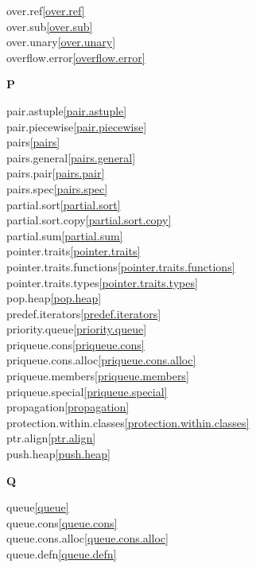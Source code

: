 \begin{multicols}{2}
over.ref\quad\ref{over.ref}\\
over.sub\quad\ref{over.sub}\\
over.unary\quad\ref{over.unary}\\
overflow.error\quad\ref{overflow.error}\\
\par \textbf{P}\par
pair.astuple\quad\ref{pair.astuple}\\
pair.piecewise\quad\ref{pair.piecewise}\\
pairs\quad\ref{pairs}\\
pairs.general\quad\ref{pairs.general}\\
pairs.pair\quad\ref{pairs.pair}\\
pairs.spec\quad\ref{pairs.spec}\\
partial.sort\quad\ref{partial.sort}\\
partial.sort.copy\quad\ref{partial.sort.copy}\\
partial.sum\quad\ref{partial.sum}\\
pointer.traits\quad\ref{pointer.traits}\\
pointer.traits.functions\quad\ref{pointer.traits.functions}\\
pointer.traits.types\quad\ref{pointer.traits.types}\\
pop.heap\quad\ref{pop.heap}\\
predef.iterators\quad\ref{predef.iterators}\\
priority.queue\quad\ref{priority.queue}\\
priqueue.cons\quad\ref{priqueue.cons}\\
priqueue.cons.alloc\quad\ref{priqueue.cons.alloc}\\
priqueue.members\quad\ref{priqueue.members}\\
priqueue.special\quad\ref{priqueue.special}\\
propagation\quad\ref{propagation}\\
protection.within.classes\quad\ref{protection.within.classes}\\
ptr.align\quad\ref{ptr.align}\\
push.heap\quad\ref{push.heap}\\
\par \textbf{Q}\par
queue\quad\ref{queue}\\
queue.cons\quad\ref{queue.cons}\\
queue.cons.alloc\quad\ref{queue.cons.alloc}\\
queue.defn\quad\ref{queue.defn}\\

\end{multicols}
